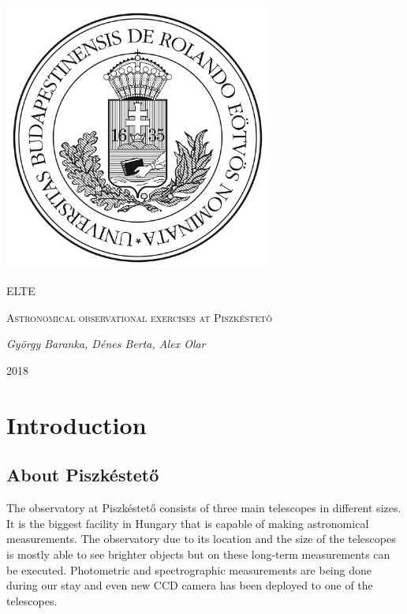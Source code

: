 \documentclass[a4paper,12pt]{article}
\begin{document}
\linespread{1.25}

\begin{titlepage}

    \centering
    \includegraphics[width=0.66\textwidth]{elte.jpg}\par\vspace{1cm}
    {\scshape\LARGE ELTE \par}
    \vspace{3cm}
    {\scshape\Large Astronomical observational exercises at Piszkéstető\par}
    \vspace{1cm}
    {\large\itshape György Baranka, Dénes Berta, Alex Olar\par}
    \vspace{3cm}
    {\large 2018 \par}

\end{titlepage}

\tableofcontents

\newpage

\section{Introduction}

\subsection{About Piszkéstető}

\par The observatory at Piszkéstető consists of three main telescopes
in different sizes. It is the biggest facility in Hungary that is capable of
making astronomical measurements. The observatory due to its location and the size of the telescopes
is mostly able to see brighter objects but on these long-term measurements can
be executed. Photometric and spectrographic measurements are being done during our
stay and even new CCD camera has been deployed to one of the telescopes.
\end{document}
